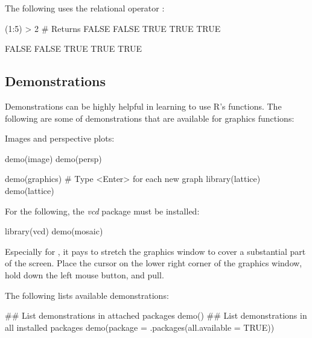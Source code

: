 The following uses the relational operator \txtt{$>$}:
\begin{Schunk}
\begin{Sinput}
(1:5) > 2  # Returns FALSE FALSE  TRUE  TRUE  TRUE
\end{Sinput}
\begin{Soutput}
[1] FALSE FALSE  TRUE  TRUE  TRUE
\end{Soutput}
\end{Schunk}

\subsection*{Demonstrations}

Demonstrations can be highly helpful in learning to use R's functions.
The following are some of demonstrations that are available for
graphics functions:
\begin{marginfigure}
Images and perspective plots:
\begin{Schunk}
\begin{Sinput}
demo(image)
demo(persp)
\end{Sinput}
\end{Schunk}
\end{marginfigure}
\begin{Schunk}
\begin{Sinput}
demo(graphics)   # Type <Enter> for each new graph
library(lattice)
demo(lattice)
\end{Sinput}
\end{Schunk}

\begin{marginfigure}For the following, the {\em vcd} package must be installed:
\begin{Schunk}
\begin{Sinput}
library(vcd)
demo(mosaic)
\end{Sinput}
\end{Schunk}
\end{marginfigure}

Especially for , it pays to stretch the graphics
window to cover a substantial part of the screen.  Place the cursor on
the lower right corner of the graphics window, hold down the left
mouse button, and pull.

The following lists available demonstrations:
\begin{Schunk}
\begin{Sinput}
## List demonstrations in attached packages
demo()
## List demonstrations in all installed packages
demo(package = .packages(all.available = TRUE))
\end{Sinput}
\end{Schunk}

